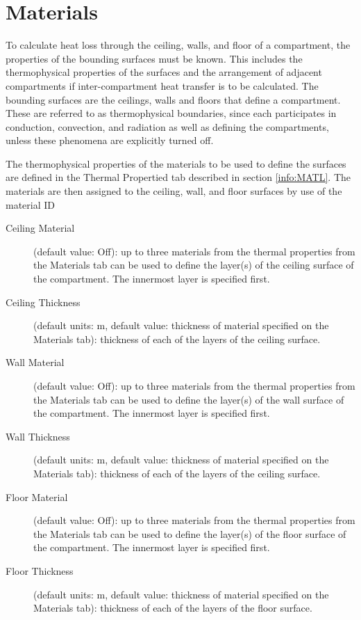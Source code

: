 \section{Materials}
\label{info:COMP2}
To calculate heat loss through the ceiling, walls, and floor of a compartment, the properties of the bounding surfaces must be known. This includes the thermophysical properties of the surfaces and the arrangement of adjacent compartments if inter-compartment heat transfer is to be calculated.
The bounding surfaces are the ceilings, walls and floors that define a compartment. These are referred to as thermophysical boundaries, since each participates in conduction, convection, and radiation as well as defining the compartments, unless these phenomena are explicitly turned off.

The thermophysical properties of the materials to be used to define the surfaces are defined in the Thermal Propertied tab described in section \ref{info:MATL}. The materials are then assigned to the ceiling, wall, and floor surfaces by use of the material ID

\begin{description}
\item[Ceiling Material] (default value: Off): up to three materials from the thermal properties from the Materials tab can be used to define the layer(s) of the ceiling surface of the compartment. The innermost layer is specified first.

\item[Ceiling Thickness] (default units: m, default value: thickness of material specified on the Materials tab): thickness of each of the layers of the ceiling surface.

\item[Wall Material] (default value: Off): up to three materials from the thermal properties from the Materials tab can be used to define the layer(s) of the wall surface of the compartment.  The innermost layer is specified first.

\item[Wall Thickness] (default units: m, default value: thickness of material specified on the Materials tab): thickness of each of the layers of the ceiling surface.

\item[Floor Material] (default value: Off): up to three materials from the thermal properties from the Materials tab can be used to define the layer(s) of the floor surface of the compartment.  The innermost layer is specified first.

\item[Floor Thickness] (default units: m, default value: thickness of material specified on the Materials tab): thickness of each of the layers of the floor surface.
\end{description}

